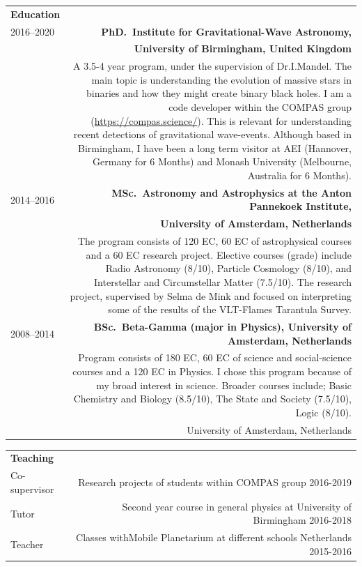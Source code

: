 \documentclass[]{res} %
\begin{document}




\begin{tabular}{L!{\VRule}R}
\Large \bf Education \normalsize & \\ [5pt]
2016--2020 &{\textbf{PhD.\ Institute for Gravitational-Wave Astronomy,}}\\
          &{\textbf{University of Birmingham, United Kingdom}}\\[1pt]
          &{A 3.5-4 year program, under the supervision of Dr.I.Mandel. The main topic is
          understanding the evolution of massive stars in binaries and how they might create binary
          black holes. I am a code developer within the COMPAS group
           (\url{https://compas.science/}). This is relevant for understanding recent detections
           of gravitational wave-events. Although based in Birmingham, I have been a long term 
            visitor at AEI (Hannover, Germany for 6 Months) and
            Monash University (Melbourne, Australia for 6 Months).}\\[5pt]

2014--2016&{\textbf{MSc.\ Astronomy and Astrophysics at the Anton Pannekoek Institute,}}\\
          &{\textbf{University of Amsterdam, Netherlands}}\\[1pt]
	  &{The program consists of 120 EC, 60 EC of astrophysical courses and a 60 EC research project. 
            Elective courses (grade) include Radio Astronomy (8/10), Particle Cosmology (8/10), and Interstellar and Circumstellar Matter (7.5/10). The research project, supervised by Selma de Mink and focused on interpreting some of the results of the VLT-Flames Tarantula Survey. }\\[5pt]


2008--2014&{\bf BSc.\ Beta-Gamma (major in Physics), University of Amsterdam, Netherlands}\\[1pt]
          &{Program consists of 180 EC, 60 EC of science and social-science courses and a 120 EC in Physics.  I chose this program because of my broad interest in science. Broader courses include; Basic Chemistry and Biology (8.5/10), The State and Society (7.5/10), Logic (8/10).}\\
	  &{University of Amsterdam, Netherlands}\\
\end{tabular}


\begin{tabular}{L!{\VRule}R}
\Large \bf Teaching \normalsize & \\ [5pt]
Co-supervisor   & {Research projects of students within COMPAS group 2016-2019}\\[5pt]

Tutor   & {Second year course in general physics at  University of Birmingham 2016-2018}\\[5pt]

Teacher & {Classes withMobile Planetarium at different schools Netherlands 2015-2016}\\[5pt]

\end{tabular}
\end{document}
